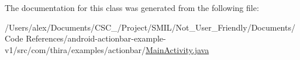 The documentation for this class was generated from the following file\-:\begin{DoxyCompactItemize}
\item 
/\-Users/alex/\-Documents/\-C\-S\-C\-\_/\-Project/\-S\-M\-I\-L/\-Not\-\_\-\-User\-\_\-\-Friendly/\-Documents/\-Code References/android-\/actionbar-\/example-\/v1/src/com/thira/examples/actionbar/\hyperlink{_main_activity_8java}{Main\-Activity.\-java}\end{DoxyCompactItemize}
